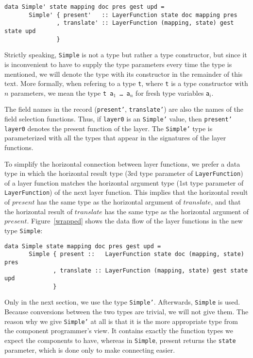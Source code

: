 \begin{small}
\begin{verbatim}
data Simple' state mapping doc pres gest upd =
       Simple' { present'   :: LayerFunction state doc mapping pres
               , translate' :: LayerFunction (mapping, state) gest state upd
               }
\end{verbatim}
\end{small}

 Strictly speaking, \texttt{Simple} is not a type but rather a type constructor, but since it is inconvenient to have to supply the type parameters every time the type is mentioned, we will denote the type with its constructor in the remainder of this text. More formally, when refering to a type \texttt{t}, where \texttt{t} is a type constructor with $n$ parameters, we mean the type \texttt{t a$_1$ \dots ~a$_n$} for fresh type variables \texttt{a$_i$}.

The field names in the record (\texttt{present'}, \texttt{translate'}) are also the names of the field selection functions. Thus, if \texttt{layer0} is an \texttt{Simple'} value, then \texttt{present' layer0} denotes the present function of the layer. The \texttt{Simple'} type is parameterized with all the types that appear in the signatures of the layer functions.

To simplify the horizontal connection between layer functions, we prefer a data type in which the horizontal result type (3rd type parameter of \texttt{LayerFunction}) of a layer function matches the horizontal argument type (1st type parameter of \texttt{LayerFunction}) of the next layer function. This implies that the horizontal result of $present$ has the same type as the horizontal argument of $translate$, and that the horizontal result of $translate$ has the same type as the horizontal argument of $present$. Figure~\ref{wrapped} shows the data flow of the layer functions in the new type \texttt{Simple}:

\begin{small}
\begin{verbatim}
data Simple state mapping doc pres gest upd =
       Simple { present ::   LayerFunction state doc (mapping, state) pres
              , translate :: LayerFunction (mapping, state) gest state upd
              }
\end{verbatim}
\end{small}

Only in the next section, we use the type \texttt{Simple'}. Afterwards, \texttt{Simple} is used. Because conversions between the two types are trivial, we will not give them. The reason why we give \texttt{Simple'} at all is that it is the more appropriate type from the component programmer's view. It contains exactly the function types we expect the components to have, whereas in \texttt{Simple}, present returns the \texttt{state} parameter, which is done only to make connecting easier.

